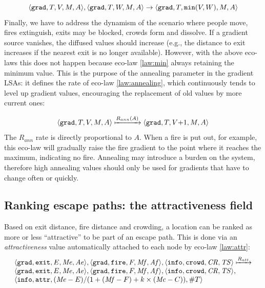 \documentclass[12pt,a4paper,twoside,openright]{book}
\begin{document}
\begin{equation}\label{law:min}
\langle \mathtt{grad}, T, V, M, A\rangle, \langle \mathtt{grad}, T, W, M, A\rangle \rightarrow \langle \mathtt{grad}, T, \texttt{min}(V,W), M, A\rangle
\end{equation}
%
\noindent Finally, we have to address the dynamism of the scenario where people move, fires extinguish, exits may be blocked, crowds form and dissolve.
%
If a gradient source vanishes, the diffused values should increase (e.g., the distance to exit increases if the nearest exit is no longer available).
%
However, with the above eco-laws this does not happen because eco-law \ref{law:min} always retaining the minimum value.
%
This is the purpose of the annealing parameter in the gradient LSAs: it defines the rate of  eco-law \ref{law:annealing}, which continuously tends to level up gradient values, encouraging the replacement of old values by more current ones:

\begin{equation}\label{law:annealing}
\langle \mathtt{grad}, T, V, M, A\rangle \xmapsto{R_{ann}(A)} \langle \mathtt{grad}, T, V\mathit{+}1, M, A\rangle
\end{equation}
%
\noindent The $R_{ann}$ rate is directly proportional to $A$. When a fire is put out, for example, this eco-law will gradually raise the fire gradient to the point where it reaches the maximum, indicating no fire.
%
Annealing may introduce a burden on the system, therefore high annealing values should only be used for gradients that have to change often or quickly.

\subsection{Ranking escape paths: the attractiveness field}

Based on exit distance, fire distance and crowding, a location can be ranked as more or less ``attractive'' to be part of an escape path.
%
This is done via an \emph{attractiveness} value automatically attached to each node by eco-law \ref{law:attr}:
%
\begin{equation}\label{law:attr}
\begin{array}{l}
\langle \mathtt{grad}, \mathtt{exit}, E, \mathit{Me}, \mathit{Ae}\rangle, \langle \mathtt{grad}, \mathtt{fire}, F, \mathit{Mf}, \mathit{Af}\rangle, \langle \mathtt{info}, \mathtt{crowd}, \mathit{CR}, \mathit{TS}\rangle \xmapsto{R_{att}} \\
\langle \mathtt{grad}, \mathtt{exit}, E, \mathit{Me}, \mathit{Ae}\rangle, \langle \mathtt{grad}, \mathtt{fire}, F, \mathit{Mf}, \mathit{Af}\rangle, \langle \mathtt{info}, \mathtt{crowd}, \mathit{CR}, \mathit{TS}\rangle, \\
 \langle \mathtt{info}, \mathtt{attr}, (\mathit{Me}-E) / (1+(\mathit{Mf}-F)+k\times(\mathit{Mc}-C)), \#T\rangle
 \end{array}
\end{equation}
\end{document}
